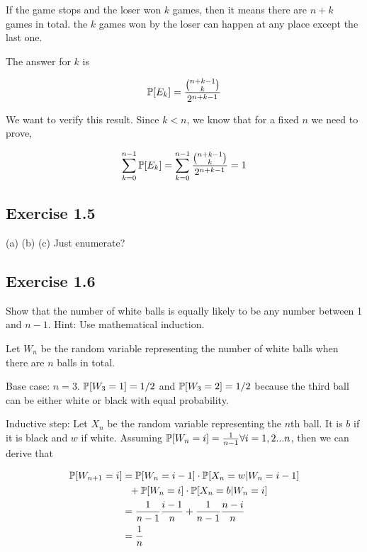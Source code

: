 If the game stops and the loser won $k$ games, then it means there are $n + k$ games in total. the $k$ games
won by the loser can happen at any place except the last one. 

The answer for $k$ is 

\begin{equation*}
\P[E_k] = \frac{\binom{n+k-1}{k}}{2^{n+k-1}}
\end{equation*}

We want to verify this result. Since $k < n$, we know that for a fixed $n$ we need to prove,

\begin{equation*}
\sum_{k = 0}^{n - 1} \P[E_k] = \sum_{k = 0}^{n - 1} \frac{\binom{n+k-1}{k}}{2^{n+k-1}} = 1
\end{equation*}


\subsection*{Exercise 1.5}

(a) (b) (c) Just enumerate?

\subsection*{Exercise 1.6}

Show that the number of white balls is equally likely to be any number between 1 and $n-1$.
Hint: Use mathematical induction.

Let $W_n$ be the random variable representing the number of white balls when there are
$n$ balls in total.

Base case: $n = 3$. $\P[W_3 = 1] = 1/2$ and $\P[W_3 = 2] = 1/2$ because the third
ball can be either white or black with equal probability.

Inductive step: Let $X_n$ be the random variable representing the $n$th ball. It is $b$ if it is
black and $w$ if white.
Assuming $\P[W_n = i] = \frac{1}{n-1} \forall i = 1,2...n$, then we can derive that

\begin{equation*}
\begin{split}
\P[W_{n+1} = i] & = \P[W_n = i - 1] \cdot \P[X_n = w | W_n = i - 1] \\
&\ \ + \P[W_n = i] \cdot \P[X_n = b | W_n = i] \\
& = \frac{1}{n-1} \frac{i - 1}{n} + \frac{1}{n - 1} \frac{n - i}{n} \\
& = \frac{1}{n}
\end{split}
\end{equation*}

